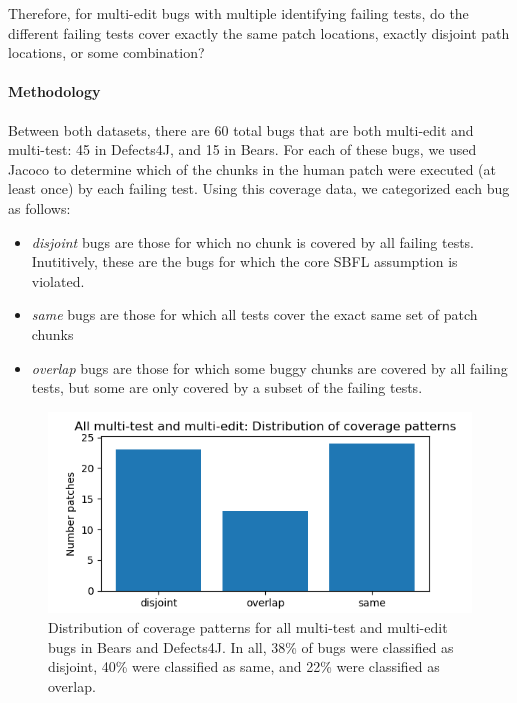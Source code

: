 Therefore, for multi-edit bugs with multiple identifying failing tests, do the 
different failing tests cover exactly the same patch locations, exactly 
disjoint path locations, or some combination?



\paragraph{Methodology}

Between both datasets, there are 60 total bugs that are both multi-edit and 
multi-test: 45 in Defects4J, and 15 in Bears. For each of these bugs, we used 
Jacoco to determine which of the chunks in the human patch were executed (at
least once) by each failing test. Using 
this coverage data, we categorized each bug as follows:
\begin{itemize}
\item \emph{disjoint} bugs are those for which no chunk is covered by all
failing tests.  Inutitively, these are the bugs for which the core SBFL
assumption is violated.
\item \emph{same} bugs are those for which all tests cover the exact same set of
  patch chunks
\item \emph{overlap} bugs are those for which some buggy chunks are covered by
  all failing tests, but some are only covered by a subset of the failing tests.
\end{itemize}


\begin{figure}
	\includegraphics[width=\linewidth]{img/coverage-all.png}
	\caption{Distribution of coverage patterns for all multi-test and 
	multi-edit bugs in Bears and Defects4J. In all, 38\% of bugs were classified as disjoint, 40\% were 
	classified as same, and 22\% were classified as overlap.}
	\label{fig:coverage-all}
\end{figure}


